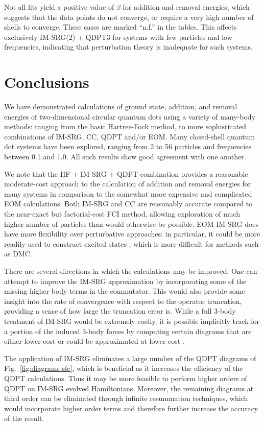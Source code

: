Not all fits yield a positive value of $\beta$ for addition and removal energies, which suggests that the data points do not converge, or require a very high number of shells to converge.  These cases are marked ``n.f.'' in the tables.  This affects exclusively IM-SRG(2) + QDPT3 for systems with few particles and low frequencies, indicating that perturbation theory is inadequate for such systems.

\section{Conclusions}
\label{sec:conclusions}

We have demonstrated calculations of ground state, addition, and removal energies of two-dimensional circular quantum dots using a variety of many-body methods: ranging from the basic Hartree-Fock method, to more sophisticated combinations of IM-SRG, CC, QDPT and/or EOM.  Many closed-shell quantum dot systems have been explored, ranging from 2 to 56 particles and frequencies between 0.1 and 1.0.  All such results show good agreement with one another.

We note that the HF + IM-SRG + QDPT combination provides a reasonable moderate-cost approach to the calculation of addition and removal energies for many systems in comparison to the somewhat more expensive and complicated EOM calculations.  Both IM-SRG and CC are reasonably accurate compared to the near-exact but factorial-cost FCI method, allowing exploration of much higher number of particles than would otherwise be possible.  EOM-IM-SRG does have more flexibility over perturbative approaches: in particular, it could be more readily used to construct excited states \cite{2016arXiv161100661P}, which is more difficult for methods such as DMC.

There are several directions in which the calculations may be improved.  One can attempt to improve the IM-SRG approximation by incorporating some of the missing higher-body terms in the commutator.  This would also provide some insight into the rate of convergence with respect to the operator truncation, providing a sense of how large the truncation error is.  While a full 3-body treatment of IM-SRG would be extremely costly, it is possible implicitly track for a portion of the induced 3-body forces by computing certain diagrams that are either lower cost or could be approximated at lower cost \cite{IMSRG}.

The application of IM-SRG eliminates a large number of the QDPT diagrams of Fig.\ \ref{fig:diagrams-sfe}, which is beneficial as it increases the efficiency of the QDPT calculations.  Thus it may be more feasible to perform higher orders of QDPT on IM-SRG evolved Hamiltonians.  Moreover, the remaining diagrams at third order can be eliminated through infinite resummation techniques, which would incorporate higher order terms and therefore further increase the accuracy of the result.

